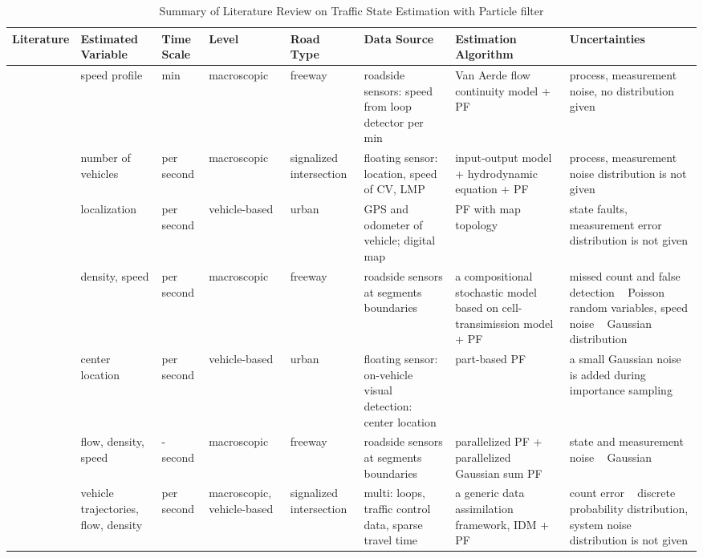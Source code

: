 \begin{landscape}
\begin{table}
\centering
\footnotesize
\caption{Summary of Literature Review on Traffic State Estimation with Particle filter \uppercase\expandafter{}}
\label{LR3}
\begin{tabularx}{\linewidth}{@{} 
>{\hsize=0.7\hsize}X  %
>{\hsize=0.6\hsize}X  %
>{\hsize=0.45\hsize}X  %
>{\hsize=0.45\hsize}X  %
>{\hsize=0.5\hsize}X  %
>{\hsize=1\hsize}X    %
>{\hsize=1.2\hsize}X  %
>{\hsize=1.5\hsize}X    %
@{}} 
\toprule
\textbf{Literature} & \textbf{Estimated Variable} & \textbf{Time Scale} & \textbf{Level} & \textbf{Road Type} & \textbf{Data Source} & \textbf{Estimation Algorithm} & \textbf{Uncertainties} \\
\midrule
\textcite{chen2011real} & speed profile & 5 min & macroscopic & freeway & roadside sensors: speed from loop detector per min & Van Aerde flow continuity model + PF & process, measurement noise, no distribution given \\
\textcite{aljamal2020real} & number of vehicles & per second & macroscopic & signalized intersection & floating sensor: location, speed of CV, LMP & input-output model + hydrodynamic equation + PF & process, measurement noise distribution is not given \\
\textcite{peker2011particle} & localization & per second & vehicle-based & urban & GPS and odometer of vehicle; digital map & PF with map topology & state faults, measurement error distribution is not given \\
\textcite{mihaylova2007freeway} & density, speed & per second & macroscopic & freeway & roadside sensors at segments boundaries & a compositional stochastic model based on cell-transimission model + PF & missed count and false detection ~ Poisson random variables, speed noise ~ Gaussian distribution \\
\textcite{fang2019road} & center location & per second & vehicle-based & urban & floating sensor: on-vehicle visual detection: center location & part-based PF & a small Gaussian noise is added during importance sampling \\
\textcite{mihaylova2012parallelized} & flow, density, speed & 10-second & macroscopic & freeway & roadside sensors at segments boundaries & parallelized PF + parallelized Gaussian sum PF & state and measurement noise ~ Gaussian \\
\textcite{xie2018generic} & vehicle trajectories, flow, density & per second & macroscopic, vehicle-based & signalized intersection & multi: loops, traffic control data, sparse travel time & a generic data assimilation framework, IDM + PF & count error ~ discrete probability distribution, system noise distribution is not given \\
\bottomrule
\end{tabularx}
\end{table}
\end{landscape}
\restoregeometry


